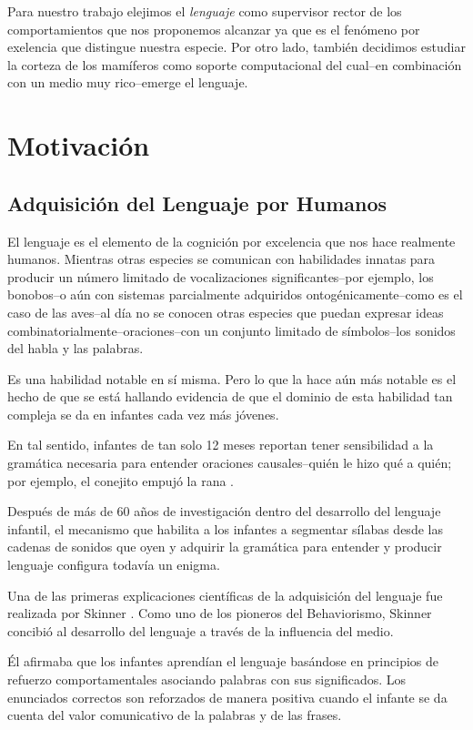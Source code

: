 Para nuestro trabajo elejimos el \emph{lenguaje} como supervisor rector de los comportamientos que nos proponemos alcanzar ya que es el fenómeno por exelencia que distingue nuestra especie. Por otro lado, también decidimos estudiar la corteza de los mamíferos como soporte computacional del cual--en combinación con un medio muy rico--emerge el lenguaje.


\section{Motivación}

\subsection{Adquisición del Lenguaje por Humanos}

El lenguaje es el elemento de la cognición por excelencia que nos hace realmente humanos.
Mientras otras especies se comunican con habilidades innatas para producir un número limitado de vocalizaciones significantes--por ejemplo, los bonobos--o aún con sistemas parcialmente adquiridos ontogénicamente--como es el caso de las aves--al día no se conocen otras especies que puedan expresar ideas combinatorialmente--oraciones--con un conjunto limitado de símbolos--los sonidos del habla y las palabras.

Es una habilidad notable en sí misma. Pero lo que la hace aún más notable es el hecho de que se está hallando evidencia de que el dominio de esta habilidad tan compleja se da en infantes cada vez más jóvenes.

En tal sentido, infantes de tan solo 12 meses reportan tener sensibilidad a la gramática necesaria para entender oraciones causales--quién le hizo qué a quién; por ejemplo, el conejito empujó la rana \cite{doi:10.1080/15475441003769411}.

Después de más de 60 años de investigación dentro del desarrollo del lenguaje infantil, el mecanismo que habilita a los infantes a segmentar sílabas desde las cadenas de sonidos que oyen y adquirir la gramática para entender y producir lenguaje configura todavía un enigma.

Una de las primeras explicaciones científicas de la adquisición del lenguaje fue realizada por Skinner \cite{skinner1957verbal}.
Como uno de los pioneros del Behaviorismo, Skinner concibió al desarrollo del lenguaje a través de la influencia del medio.

Él afirmaba que los infantes aprendían el lenguaje basándose en principios de refuerzo comportamentales asociando palabras con sus significados.
Los enunciados correctos son reforzados de manera positiva cuando el infante se da cuenta del valor comunicativo de la palabras y de las frases.

